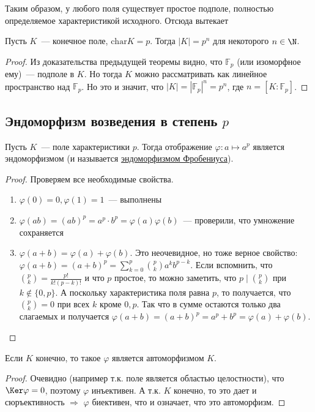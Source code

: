Таким образом, у любого поля существует простое подполе, полностью определяемое характеристикой исходного.
Отсюда вытекает

\follow Пусть $K$~--- конечное поле, $\text{char} K = p$. Тогда $|K|=p^n$ для некоторого $n\in\N$.
\begin{proof}
    Из доказательства предыдущей теоремы видно, что $\mathbb{F}_p$ (или изоморфное ему)~--- подполе в $K$.
    Но тогда $K$ можно рассматривать как линейное пространство над $\mathbb{F}_p$.
    Но это и значит, что $|K|=|\mathbb{F}_p|^n=p^n$, где $n = [K:\mathbb{F}_p]$.
\end{proof}

\subsection{Эндоморфизм возведения в степень $p$}
\begin{lemma}
    Пусть $K$~--- поле характеристики $p$.
    Тогда отображение $\varphi: a \mapsto a^p$ является эндоморфизмом (и называется \underline{эндоморфизмом Фробениуса}).
\end{lemma}
\begin{proof}
    Проверяем все необходимые свойства.
    \begin{enumerate}
        \item $\varphi(0)=0, \varphi(1)=1$~--- выполнены
        \item $\varphi(ab) = (ab)^p = a^p \cdot b^p = \varphi(a)\varphi(b)$~--- проверили, что умножение сохраняется
        \item $\varphi(a+b)=\varphi(a)+\varphi(b)$.
        Это неочевидное, но тоже верное свойство: $\varphi(a+b)=(a+b)^p = \sum_{k=0}^p \binom{p}{k} a^k b^{p-k}$.
        Если вспомнить, что $\binom{p}{k} = \frac{p!}{k!(p-k)!}$ и что $p$ простое, то можно заметить, что $p \mid \binom{p}{k}$ при $k\notin \{0, p\}$.
        А поскольку характеристика поля равна $p$, то получается, что $\binom{p}{k}=0$ при всех $k$ кроме $0, p$.
        Так что в сумме остаются только два слагаемых и получается $\varphi(a+b)=(a+b)^p = a^p + b^p = \varphi(a) + \varphi(b)$.
    \end{enumerate}
\end{proof}
\follow Если $K$ конечно, то такое $\varphi$ является автоморфизмом $K$.
\begin{proof}
    Очевидно (например т.к. поле является областью целостности), что $\Ker \varphi = 0$, поэтому $\varphi$ инъективен.
    А т.к. $K$ конечно, то это дает и сюръективность $\Rightarrow$ $\varphi$ биективен, что и означает, что это автоморфизм.
\end{proof}

